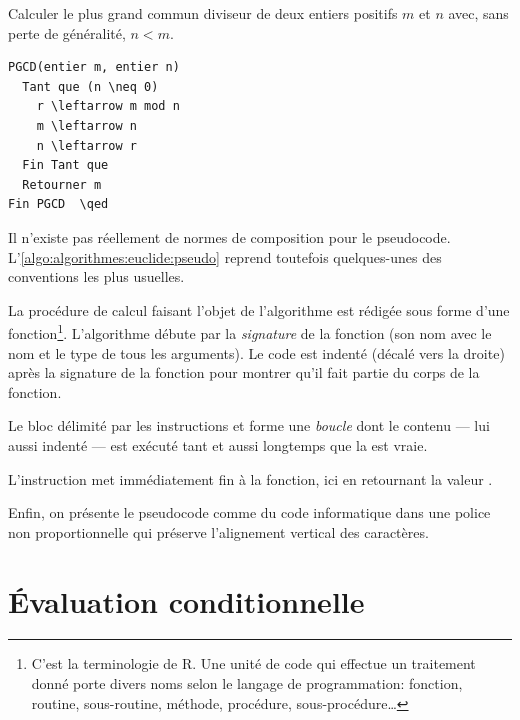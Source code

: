 \begin{algorithme}
  \label{algo:algorithmes:euclide:pseudo}
  Calculer le plus grand commun diviseur de deux entiers positifs $m$
  et $n$ avec, sans perte de généralité, $n < m$.
  \begin{pseudocode}
\begin{Verbatim}[commandchars=\\\{\}]
PGCD(entier m, entier n)
  Tant que (n \neq 0)
    r \leftarrow m mod n
    m \leftarrow n
    n \leftarrow r
  Fin Tant que
  Retourner m
Fin PGCD  \qed
\end{Verbatim}
  \end{pseudocode}
\end{algorithme}


Il n'existe pas réellement de normes de composition pour le
pseudocode. L'\autoref{algo:algorithmes:euclide:pseudo} reprend
toutefois quelques-unes des conventions les plus usuelles.

La procédure de calcul faisant l'objet de l'algorithme est rédigée
sous forme d'une fonction\footnote{%
  C'est la terminologie de R. Une unité de code qui effectue un
  traitement donné porte divers noms selon le langage de
  programmation: fonction, routine, sous-routine, méthode, procédure,
  sous-procédure\dots}. %
L'algorithme débute par la \emph{signature} de la
fonction (son nom avec le nom et le type de tous les arguments). Le
code est indenté (décalé vers la droite) après la
signature de la fonction pour montrer qu'il fait partie du corps de la
fonction.

Le bloc délimité par les instructions  et  forme une
\emph{boucle} dont le contenu --- lui aussi indenté ---
est exécuté tant et aussi longtemps que la  est vraie.

L'instruction  met immédiatement fin à la fonction,
ici en retournant la valeur .

Enfin, on présente le pseudocode comme du code informatique dans une
police non proportionnelle qui préserve l'alignement vertical des
caractères.


\section{Évaluation conditionnelle}
\label{sec:algorithmes:if-else}

